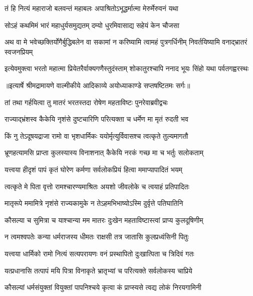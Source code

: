 \twolineshloka
{तं हि नित्यं महाराजो बलवन्तं महाबलः}
{अपाश्रितोऽभूद्धर्मात्मा मेरुर्मेरुवनं यथा} %

\twolineshloka
{सोऽहं कथमिमं भारं महाधुर्यसमुद्यतम्}
{दम्यो धुरमिवासाद्य सहेयं केन चौजसा} %

\threelineshloka
{अथ वा मे भवेच्छक्तिर्योगैर्बुद्धिबलेन वा}
{सकामां न करिष्यामि त्वामहं पुत्रगर्धिनीम्}
{निवर्तयिष्यामि वनाद्भ्रातरं स्वजनप्रियम्} %

\fourlineindentedshloka
{इत्येवमुक्त्वा भरतो महात्मा}
{ प्रियेतरैर्वाक्यगणैस्तुदंस्ताम्}
{शोकातुरश्चापि ननाद भूयः}
{ सिंहो यथा पर्वतगह्वरस्थः} %


{॥इत्यार्षे श्रीमद्रामायणे वाल्मीकीये आदिकाव्ये अयोध्याकाण्डे सप्तषष्टितमः सर्गः॥}


\twolineshloka
{तां तथा गर्हयित्वा तु मातरं भरतस्तदा}
{रोषेण महताविष्टः पुनरेवाब्रवीद्वचः} %

\twolineshloka
{राज्याद्भ्रंशस्व कैकेयि नृशंसे दुष्टचारिणि}
{परित्यक्ता च धर्मेण मा मृतं रुदती भव} %

\twolineshloka
{किं नु तेऽदूषयद्राजा रामो वा भृशधार्मिकः}
{ययोर्मृत्युर्विवासश्च त्वत्कृते तुल्यमागतौ} %

\twolineshloka
{भ्रूणहत्यामसि प्राप्ता कुलस्यास्य विनाशनात्}
{कैकेयि नरकं गच्छ मा च भर्तुः सलोकताम्} %

\twolineshloka
{यत्त्वया हीदृशं पापं कृतं घोरेण कर्मणा}
{सर्वलोकप्रियं हित्वा ममाप्यापादितं भयम्} %

\twolineshloka
{त्वत्कृते मे पिता वृत्तो रामश्चारण्यमाश्रितः}
{अयशो जीवलोके च त्वयाहं प्रतिपादितः} %

\twolineshloka
{मातृरूपे ममामित्रे नृशंसे राज्यकामुके}
{न तेऽहमभिभाष्योऽस्मि दुर्वृत्ते पतिघातिनि} %

\twolineshloka
{कौसल्या च सुमित्रा च याश्चान्या मम मातरः}
{दुःखेन महताविष्टास्त्वां प्राप्य कुलदूषिणीम्} %

\twolineshloka
{न त्वमश्वपतेः कन्या धर्मराजस्य धीमतः}
{राक्षसी तत्र जातासि कुलप्रध्वंसिनी पितुः} %

\twolineshloka
{यत्त्वया धार्मिको रामो नित्यं सत्यपरायणः}
{वनं प्रस्थापितो दुःखात्पिता च त्रिदिवं गतः} %

\twolineshloka
{यत्प्रधानासि तत्पापं मयि पित्रा विनाकृते}
{भ्रातृभ्यां च परित्यक्ते सर्वलोकस्य चाप्रिये} %

\twolineshloka
{कौसल्यां धर्मसंयुक्तां वियुक्तां पापनिश्चये}
{कृत्वा कं प्राप्स्यसे त्वद्य लोकं निरयगामिनी} %

